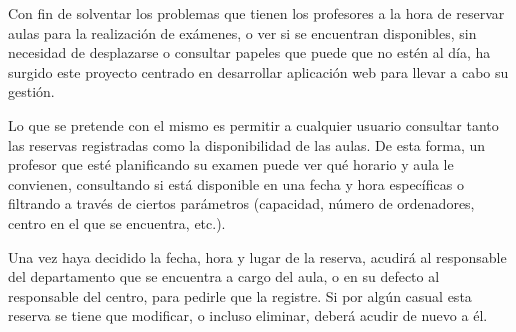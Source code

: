 
Con fin de solventar los problemas que tienen los profesores a la hora de reservar aulas para la realización de exámenes, o ver si se encuentran disponibles, sin necesidad de desplazarse o consultar papeles que puede que no estén al día, ha surgido este proyecto centrado en desarrollar aplicación web para llevar a cabo su gestión.

Lo que se pretende con el mismo es permitir a cualquier usuario consultar tanto las reservas registradas como la disponibilidad de las aulas. De esta forma, un profesor que esté planificando su examen puede ver qué horario y aula le convienen, consultando si está disponible en una fecha y hora específicas o filtrando a través de ciertos parámetros (capacidad, número de ordenadores, centro en el que se encuentra, etc.).

Una vez haya decidido la fecha, hora y lugar de la reserva, acudirá al responsable del departamento que se encuentra a cargo del aula, o en su defecto al responsable del centro, para pedirle que la registre. Si por algún casual esta reserva se tiene que modificar, o incluso eliminar, deberá acudir de nuevo a él.
